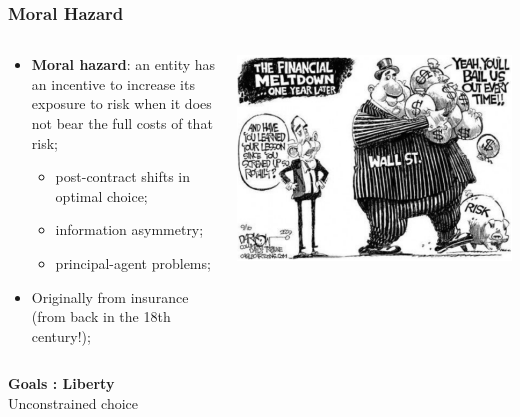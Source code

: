 \documentclass[aspectratio=169]{beamer}
\theoremstyle{principle}
\begin{document}
\begin{frame}
\frametitle{Moral Hazard}
\begin{columns}
\begin{column}{0.5\textwidth}

\begin{itemize}
\item \textbf{Moral hazard}: an entity has an incentive to increase its exposure to risk when it does not bear the full costs of that risk;
\begin{itemize}
\item post-contract shifts in optimal choice;
\item information asymmetry;
\item principal-agent problems;
\end{itemize}
\bigskip
\item Originally from insurance (from back in the 18th century!);
\end{itemize}
\end{column}
\begin{column}{0.5\textwidth}
\includegraphics[scale=0.3]{moral_hazard.png}
\end{column}
\end{columns}
\end{frame}

\begin{frame}

\begin{center}
\Huge\textbf{Goals : Liberty}\\
\bigskip
\bigskip
\large Unconstrained choice
\end{center}

\end{frame}
\end{document}
